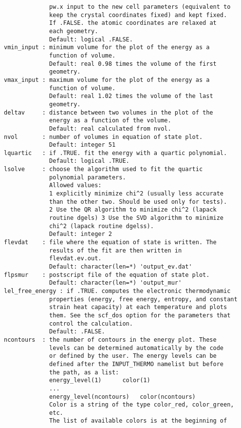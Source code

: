 \documentclass[12pt,a4paper,twoside]{report}
\begin{document}
\begin{verbatim}
             pw.x input to the new cell parameters (equivalent to 
             keep the crystal coordinates fixed) and kept fixed. 
             If .FALSE. the atomic coordinates are relaxed at 
             each geometry.
             Default: logical .FALSE.
vmin_input : minimum volume for the plot of the energy as a 
             function of volume.
             Default: real 0.98 times the volume of the first 
             geometry.
vmax_input : maximum volume for the plot of the energy as a 
             function of volume.
             Default: real 1.02 times the volume of the last 
             geometry.
deltav     : distance between two volumes in the plot of the 
             energy as a function of the volume.
             Default: real calculated from nvol.
nvol       : number of volumes in equation of state plot.
             Default: integer 51
lquartic   : if .TRUE. fit the energy with a quartic polynomial.
             Default: logical .TRUE.
lsolve     : choose the algorithm used to fit the quartic 
             polynomial parameters.
             Allowed values:
             1 explicitly minimize chi^2 (usually less accurate 
             than the other two. Should be used only for tests).
             2 Use the QR algorithm to minimize chi^2 (lapack 
             routine dgels) 3 Use the SVD algorithm to minimize 
             chi^2 (lapack routine dgelss).
             Default: integer 2
flevdat    : file where the equation of state is written. The 
             results of the fit are then written in 
             flevdat.ev.out.
             Default: character(len=*) 'output_ev.dat'
flpsmur    : postscript file of the equation of state plot.
             Default: character(len=*) 'output_mur'
lel_free_energy : if .TRUE. computes the electronic thermodynamic 
             properties (energy, free energy, entropy, and constant 
             strain heat capacity) at each temperature and plots 
             them. See the scf_dos option for the parameters that 
             control the calculation.
             Default: .FALSE.
ncontours  : the number of contours in the energy plot. These 
             levels can be determined automatically by the code 
             or defined by the user. The energy levels can be 
             defined after the INPUT_THERMO namelist but before 
             the path, as a list:
             energy_level(1)      color(1)
             ...
             energy_level(ncontours)   color(ncontours) 
             Color is a string of the type color_red, color_green, 
             etc.
             The list of available colors is at the beginning of 

\end{verbatim}
\end{document}
